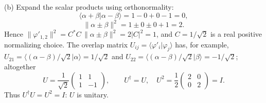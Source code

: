 (b) Expand the scalar products using orthonormality:
\[
\langle\alpha+\beta|\alpha-\beta\rangle=1-0+0-1=0,
\]
\[
\|\alpha\pm\beta\|^2=1\pm0\pm0+1=2.
\]
Hence $\|\varphi'_{1,2}\|^2=C^*C\,\|\alpha\pm\beta\|^2=2|C|^2=1$, and
$C=1/\sqrt2$ is a real positive normalizing choice. The overlap
matrix $U_{ij}=\langle\varphi'_i|\varphi_j\rangle$ has, for example,
$U_{21}=\langle(\alpha-\beta)/\sqrt2|\alpha\rangle=1/\sqrt2$ and
$U_{22}=\langle(\alpha-\beta)/\sqrt2|\beta\rangle=-1/\sqrt2$; altogether
\[
\boxed{U=\frac1{\sqrt2}\begin{pmatrix}1&1\\1&-1\end{pmatrix}},
\qquad U^\dagger=U,\quad U^2=\frac12\begin{pmatrix}2&0\\0&2\end{pmatrix}=I.
\]
Thus $U^\dagger U=U^2=I$: $U$ is unitary.

